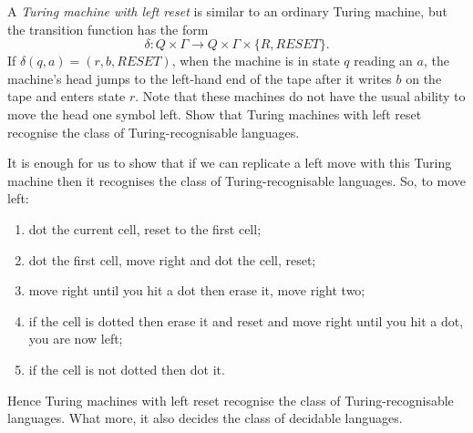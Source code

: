\question A \emph{Turing machine with left reset} is similar to an ordinary Turing machine, but the transition function has the form
\[ \delta: Q \times \Gamma \to Q \times \Gamma \times \{R, RESET\}. \]
If 
$\delta(q, a) = (r, b, RESET)$,
when the machine is in state $q$ reading an $a$, the machine's head jumps to the left-hand end of the tape after it writes $b$ on the tape and enters state $r$. Note that these machines do not have the usual ability to move the head one symbol left. Show that Turing machines with left reset recognise the class of Turing-recognisable languages.
\begin{solution}
    It is enough for us to show that if we can replicate a left move with this Turing machine then it recognises the class of Turing-recognisable languages. So, to move left:
    \begin{enumerate}
        \item dot the current cell, reset to the first cell;
        \item dot the first cell, move right and dot the cell, reset;
        \item move right until you hit a dot then erase it, move right two;
        \item if the cell is dotted then erase it and reset and move right until you hit a dot, you are now left;
        \item if the cell is not dotted then dot it.
    \end{enumerate}
    Hence Turing machines with left reset recognise the class of Turing-recognisable languages. What more, it also decides the class of decidable languages.
\end{solution}
